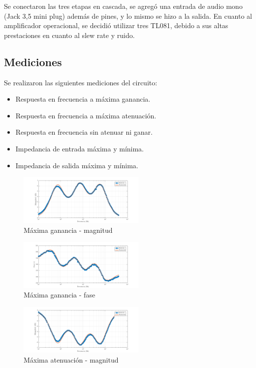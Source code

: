 \documentclass[../../tc_tp3_main.tex]{subfiles}
\begin{document}
Se conectaron las tres etapas en cascada, se agregó una entrada de audio mono (Jack 3,5 mini plug) además de pines, y lo mismo se hizo a la salida. En cuanto al amplificador operacional, se decidió utilizar tres TL081, debido a sus altas prestaciones en cuanto al slew rate y ruido.

\subsection{Mediciones}
Se realizaron las siguientes mediciones del circuito:
\begin{itemize}
 \item Respuesta en frecuencia a máxima ganancia.
 \item Respuesta en frecuencia a máxima atenuación.
 \item Respuesta en frecuencia sin atenuar ni ganar.
 \item Impedancia de entrada máxima y mínima.
 \item Impedancia de salida máxima y mínima.
\end{itemize}

\begin{figure}[H]
\centering
\includegraphics[width=0.55\textwidth]{imagenes/max_m.png}
\caption{M\'axima ganancia - magnitud} 
\end{figure}

\begin{figure}[H]
\centering
\includegraphics[width=0.55\textwidth]{imagenes/max_f.png}
\caption{M\'axima ganancia - fase} 
\end{figure}

\begin{figure}[H]
\centering
\includegraphics[width=0.55\textwidth]{imagenes/min_m.png}
\caption{M\'axima atenuación - magnitud} 
\end{figure}
\end{document}
